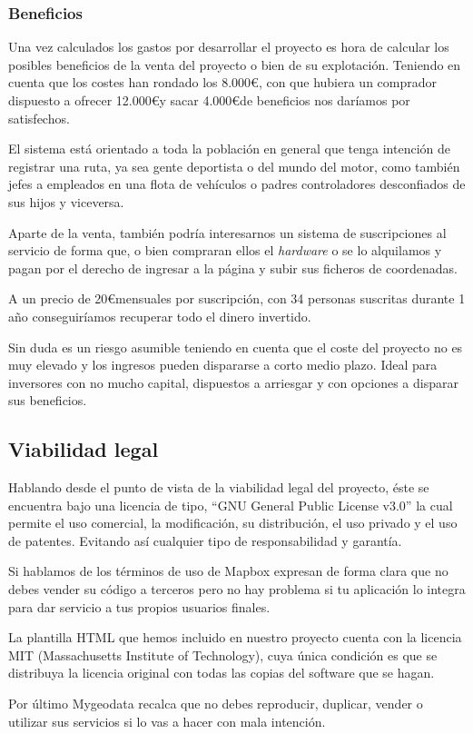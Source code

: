 \subsubsection{Beneficios}
Una vez calculados los gastos por desarrollar el proyecto es hora de calcular los posibles beneficios de la venta del proyecto o bien de su explotación. Teniendo en cuenta que los costes han rondado los 8.000\euro , con que hubiera un comprador dispuesto a ofrecer 12.000\euro  y sacar 4.000\euro  de beneficios nos daríamos por satisfechos.

El sistema está orientado a toda la población en general que tenga intención de registrar una ruta, ya sea gente deportista o del mundo del motor, como también jefes a empleados en una flota de vehículos o padres controladores desconfiados de sus hijos y viceversa.

Aparte de la venta, también podría interesarnos un sistema de suscripciones al servicio de forma que, o bien compraran ellos el \textit{hardware} o se lo alquilamos y pagan por el derecho de ingresar a la página y subir sus ficheros de coordenadas. 

A un precio de 20\euro  mensuales por suscripción, con 34 personas suscritas durante 1 año conseguiríamos recuperar todo el dinero invertido. 

Sin duda es un riesgo asumible teniendo en cuenta que el coste del proyecto no es muy elevado y los ingresos pueden dispararse a corto medio plazo. Ideal para inversores con no mucho capital, dispuestos a arriesgar y con opciones a disparar sus beneficios.

\subsection{Viabilidad legal}
Hablando desde el punto de vista de la viabilidad legal del proyecto, éste se encuentra bajo una licencia de tipo, ``GNU General Public License v3.0'' la cual permite el uso comercial, la modificación, su distribución, el uso privado y el uso de patentes. Evitando así cualquier tipo de responsabilidad y garantía. \cite{gpslicense}

Si hablamos de los términos de uso de Mapbox expresan de forma clara que no debes vender su código a terceros pero no hay problema si tu aplicación lo integra para dar servicio a tus propios usuarios finales. \cite{mapbox}

La plantilla HTML que hemos incluido\cite{pagina} en nuestro proyecto cuenta con la licencia MIT (Massachusetts Institute of Technology), cuya única condición es que se distribuya la licencia original con todas las copias del software que se hagan.

Por último Mygeodata recalca que no debes reproducir, duplicar, vender o utilizar sus servicios si lo vas a hacer con mala intención. \cite{mygeodata}
